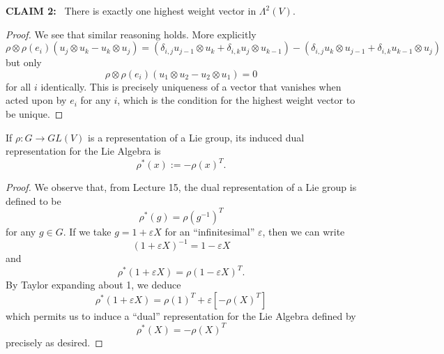 \vskip 4pt
\noindent\textbf{C\uppercase{{\footnotesize laim}} 2:}~ There is exactly one highest weight
vector in $\Lambda^{2}(V)$.

\begin{proof}
We see that similar reasoning holds. More explicitly
\begin{equation}
\rho\otimes\rho(e_{i})(u_{j}\otimes u_{k}-u_{k}\otimes u_{j})=
\left(\delta_{i,j}u_{j-1}\otimes u_{k}+\delta_{i,k}u_{j}\otimes
u_{k-1}\right)-
\left(\delta_{i,j}u_{k}\otimes u_{j-1}+\delta_{i,k}u_{k-1}\otimes
u_{j}\right)
\end{equation}
but only
\begin{equation}
\rho\otimes\rho(e_{i})(u_{1}\otimes u_{2}-u_{2}\otimes u_{1})=0
\end{equation}
for all $i$ identically. This is precisely uniqueness of a vector
that vanishes when acted upon by $e_{i}$ for any $i$, which is
the condition for the highest weight vector to be unique.
\end{proof}

\begin{lem}
If $\rho\colon G\to GL(V)$ is a representation of a
Lie group, its induced dual representation for the Lie Algebra is 
\begin{equation}
\rho^{*}(x):=-\rho(x)^{T}.
\end{equation}
\end{lem}
\begin{proof}
We observe that, from Lecture 15, the dual representation of a
Lie group is defined to be
\begin{equation}
\rho^{*}(g)=\rho(g^{-1})^{T}
\end{equation}
for any $g\in G$. If we take $g=1+\varepsilon X$ for an
``infinitesimal'' $\varepsilon$, then we can write
\begin{equation}
(1+\varepsilon X)^{-1}=1-\varepsilon X
\end{equation}
and
\begin{equation}
\rho^{*}(1+\varepsilon X)=\rho(1-\varepsilon X)^{T}.
\end{equation}
By Taylor expanding about 1, we deduce
\begin{equation}
\rho^{*}(1+\varepsilon X)=\rho(1)^{T}+\varepsilon\left[-\rho(X)^{T}\right]
\end{equation}
which permits us to induce a ``dual'' representation for the Lie
Algebra defined by
\begin{equation}
\rho^{*}(X)=-\rho(X)^{T}
\end{equation}
precisely as desired.
\end{proof}
\vskip 4pt

